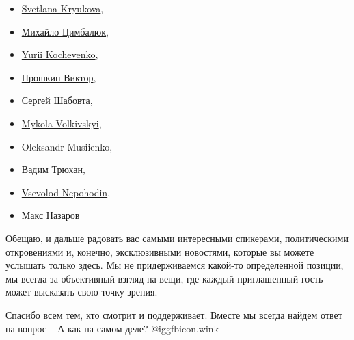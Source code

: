 \begin{multicols}{2}
\begin{itemize}
  \item \href{https://www.facebook.com/kryukova}{Svetlana Kryukova},
  \item \href{https://www.facebook.com/myhaylocymbalyk}{Михайло Цимбалюк}, 
  \item \href{https://www.facebook.com/Kochevenko}{Yurii Kochevenko}, 
  \item \href{https://www.facebook.com/profile.php?id=100046439387901}{Прошкин Виктор}, 
  \item \href{https://www.facebook.com/profile.php?id=100023534419447}{Сергей Шабовта}, 
  \item \href{https://www.facebook.com/nickolas.volkovski}{Mykola Volkivskyi}, 
  \item Oleksandr Musiienko, 
  \item \href{https://www.facebook.com/vadymholub}{Вадим Трюхан}, 
  \item \href{https://www.facebook.com/npgd101}{Vsevolod Nepohodin},
  \item \href{https://www.facebook.com/maks.nazaroff}{Макс Назаров}
\end{itemize}
\end{multicols}

Обещаю, и дальше радовать вас самыми интересными спикерами, политическими
откровениями и, конечно, эксклюзивными новостями, которые вы можете услышать
только здесь. Мы не придерживаемся какой-то определенной позиции, мы всегда за
объективный взгляд на вещи, где каждый приглашенный гость может высказать свою
точку зрения.

Спасибо всем тем, кто смотрит и поддерживает. Вместе мы всегда найдем ответ на
вопрос – А как на самом деле?  @igg{fbicon.wink} 

